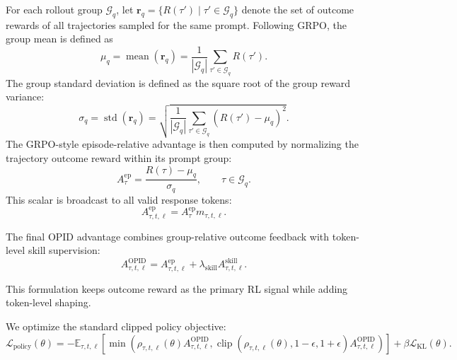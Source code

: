 \documentclass{llmxive}
\begin{document}
For each rollout group $\mathcal{G}_q$, let
$\mathbf{r}_q=\{R(\tau')\mid \tau'\in\mathcal{G}_q\}$ denote the set of outcome rewards of all trajectories sampled for the same prompt. Following GRPO, the group mean is defined as
\begin{equation*}
    \mu_q
    =
    \operatorname{mean}(\mathbf{r}_q)
    =
    \frac{1}{|\mathcal{G}_q|}
    \sum_{\tau'\in\mathcal{G}_q} R(\tau').
\end{equation*}
The group standard deviation is defined as the square root of the group reward variance:
\begin{equation*}
    \sigma_q
    =
    \operatorname{std}(\mathbf{r}_q)
    =
    \sqrt{
    \frac{1}{|\mathcal{G}_q|}
    \sum_{\tau'\in\mathcal{G}_q}
    \left(R(\tau')-\mu_q\right)^2
    }.
\end{equation*}
The GRPO-style episode-relative advantage is then computed by normalizing the trajectory outcome reward within its prompt group:
\begin{equation*}
    A^{\mathrm{ep}}_{\tau}
    =
    \frac{R(\tau)-\mu_q}{\sigma_q},
    \qquad \tau\in\mathcal{G}_q.
\end{equation*}
This scalar is broadcast to all valid response tokens:
\begin{equation*}
    A^{\mathrm{ep}}_{\tau,t,\ell}
    =
    A^{\mathrm{ep}}_{\tau} m_{\tau,t,\ell}.
\end{equation*}

The final OPID advantage combines group-relative outcome feedback with token-level skill supervision:
\begin{equation*}
    A^{\text{OPID}}_{\tau,t,\ell}
    =
    A^{\mathrm{ep}}_{\tau,t,\ell}
    +
    \lambda_{\mathrm{skill}}
    A^{\mathrm{skill}}_{\tau,t,\ell}.
\end{equation*}

This formulation keeps outcome reward as the primary RL signal while adding token-level shaping.

We optimize the standard clipped policy objective:
\begin{equation*}
    \mathcal{L}_{\mathrm{policy}}(\theta)
    =
    -
    \mathbb{E}_{\tau,t,\ell}
    \left[
    \min
    \left(
        \rho_{\tau,t,\ell}(\theta) A^{\text{OPID}}_{\tau,t,\ell},
        \operatorname{clip}
        \left(
            \rho_{\tau,t,\ell}(\theta),
            1-\epsilon,
            1+\epsilon
        \right)
        A^{\text{OPID}}_{\tau,t,\ell}
    \right)
    \right] +\beta \mathcal L_{\mathrm{KL}}(\theta).
\end{equation*}
\end{document}
